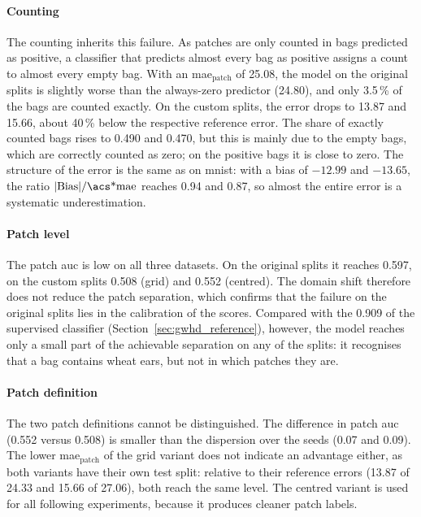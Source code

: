\documentclass[12pt,parskip = half, DIV=classic,listof=totoc]{scrartcl}
\begin{document}
				\paragraph{Counting}
				The counting inherits this failure. As patches are only counted in bags
				predicted as positive, a classifier that predicts almost every bag as positive
				assigns a count to almost every empty bag. With an \acs*{mae}$_{\text{patch}}$ of
				25.08, the model on the original splits is slightly worse than the always-zero
				predictor (24.80), and only 3.5\,\% of the bags are counted exactly. On the
				custom splits, the error drops to 13.87 and 15.66, about 40\,\% below the
				respective reference error. The share of exactly counted bags rises to 0.490 and
				0.470, but this is mainly due to the empty bags, which are correctly counted as
				zero; on the positive bags it is close to zero. The structure of the error is the
				same as on \ac{mnist}: with a bias of $-12.99$ and $-13.65$, the ratio
				$|\text{Bias}|/\text{\acs*{mae}}$ reaches 0.94 and 0.87, so almost the entire
				error is a systematic underestimation.
				
				\paragraph{Patch level}
				The patch \ac{auc} is low on all three datasets. On the original splits it
				reaches 0.597, on the custom splits 0.508 (grid) and 0.552 (centred). The domain
				shift therefore does not reduce the patch separation, which confirms that the
				failure on the original splits lies in the calibration of the scores. Compared
				with the 0.909 of the supervised classifier (Section~\ref{sec:gwhd_reference}),
				however, the model reaches only a small part of the achievable separation on any
				of the splits: it recognises that a bag contains wheat ears, but not in which
				patches they are.
				
				\paragraph{Patch definition}
				The two patch definitions cannot be distinguished. The difference in patch
				\ac{auc} (0.552 versus 0.508) is smaller than the dispersion over the seeds (0.07
				and 0.09). The lower \acs*{mae}$_{\text{patch}}$ of the grid variant does not
				indicate an advantage either, as both variants have their own test split: relative
				to their reference errors (13.87 of 24.33 and 15.66 of 27.06), both reach the same
				level. The centred variant is used for all following experiments, because it
				produces cleaner patch labels.
				
\end{document}
